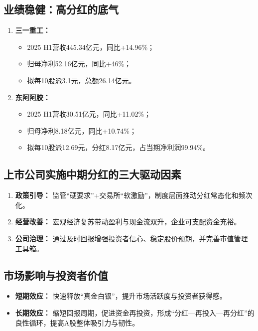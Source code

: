 \subsection{业绩稳健：高分红的底气}
\begin{enumerate}[leftmargin=*, nosep]
    \item \textbf{三一重工：}
    \begin{itemize}[nosep]
        \item 2025 H1营收445.34亿元，同比+14.96\%；
        \item 归母净利52.16亿元，同比+46\%；
        \item 拟每10股派3.1元，总额26.14亿元。
    \end{itemize}
    \item \textbf{东阿阿胶：}
    \begin{itemize}[nosep]
        \item 2025 H1营收30.51亿元，同比+11.02\%；
        \item 归母净利8.18亿元，同比+10.74\%；
        \item 拟每10股派12.69元，分红8.17亿元，占当期净利润99.94\%。
    \end{itemize}
\end{enumerate}

\subsection{上市公司实施中期分红的三大驱动因素}
\begin{enumerate}[leftmargin=*, nosep]
    \item \textbf{政策引导：} 监管“硬要求”+交易所“软激励”，制度层面推动分红常态化和频次化。
    \item \textbf{经营改善：} 宏观经济复苏带动盈利与现金流双升，企业可支配资金充裕。
    \item \textbf{公司治理：} 通过及时回报增强投资者信心、稳定股价预期，并完善市值管理工具箱。
\end{enumerate}

\subsection{市场影响与投资者价值}
\begin{itemize}[leftmargin=*, nosep]
    \item \textbf{短期效应：} 快速释放“真金白银”，提升市场活跃度与投资者获得感。
    \item \textbf{长期效应：} 缩短回报周期，促进资金再投资，形成“分红—再投入—再分红”的良性循环，提高A股整体吸引力与韧性。
\end{itemize}


